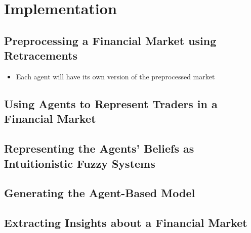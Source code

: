 \chapter{Implementation}
\label{chapter:implementation}

\section{Preprocessing a Financial Market using Retracements}
\label{section:preprocessing-a-financial-market-using-retracements:implementation}

\begin{itemize}
\item Each agent will have its own version of the preprocessed market
\end{itemize}

\section{Using Agents to Represent Traders in a Financial Market}
\label{section:using-agents-to-represent-traders-in-a-financial-market:implementation}

\section{Representing the Agents' Beliefs as Intuitionistic Fuzzy Systems}
\label{section:representing-the-agents-beliefs-as-intuitionistic-fuzzy-systems}

\section{Generating the Agent-Based Model}
\label{section:generating-the-agent-based-model}

\section{Extracting Insights about a Financial Market}
\label{section:extracting-insights-about-a-financial-market}